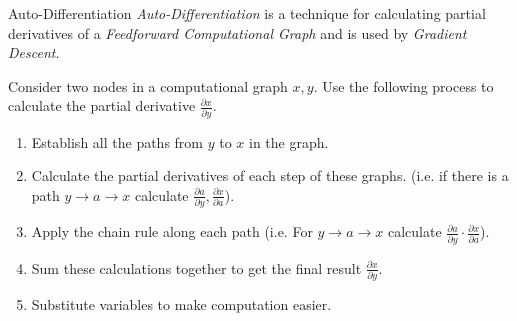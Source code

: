 \documentclass[11pt,a4paper]{article}
\begin{document}
  \begin{definition}{Auto-Differentiation}
    \textit{Auto-Differentiation} is a technique for calculating partial derivatives of a \textit{Feedforward Computational Graph} and is used by \textit{Gradient Descent}.
    \par Consider two nodes in a computational graph $x,y$. Use the following process to calculate the partial derivative $\frac{\partial x}{\partial y}$.
    \begin{enumerate}
      \item Establish all the paths from $y$ to $x$ in the graph.
      \item Calculate the partial derivatives of each step of these graphs. (i.e. if there is a path $y\to a\to x$ calculate $\frac{\partial a}{\partial y},\frac{\partial x}{\partial a}$).
      \item Apply the chain rule along each path (i.e. For $y\to a\to x$ calculate $\frac{\partial a}{\partial y}\cdot\frac{\partial x}{\partial a}$).
      \item Sum these calculations together to get the final result $\frac{\partial x}{\partial y}$.
      \item Substitute variables to make computation easier.
    \end{enumerate}
  \end{definition}
\end{document}
